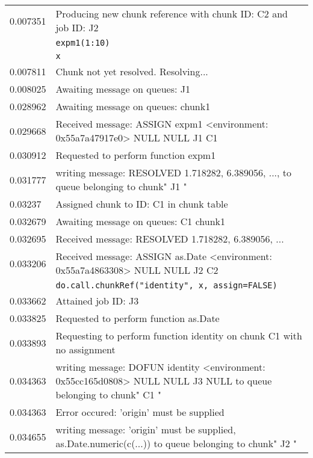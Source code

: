 \documentclass[a4paper,10pt]{article}
\begin{document}
\begin{table}
\begin{tabularx}{\textwidth}{lX}
		0.007351 & \textcolor{\clientcolour}{Producing new chunk reference with chunk ID: C2 and job ID: J2} \\
			 & \textcolor{\clientcolour}{\texttt{expm1(1:10)}} \\
			 & \textcolor{\clientcolour}{\texttt{x}} \\
		0.007811 & \textcolor{\clientcolour}{Chunk not yet resolved. Resolving...} \\
		0.008025 & \textcolor{\clientcolour}{Awaiting message on queues: J1} \\
		0.028962 & \textcolor{\servercolour}{Awaiting message on queues: chunk1} \\
		0.029668 & \textcolor{\servercolour}{Received message: ASSIGN expm1 <environment: 0x55a7a47917e0> NULL NULL J1 C1} \\
		0.030912 & \textcolor{\servercolour}{Requested to perform function expm1} \\
		0.031777 & \textcolor{\servercolour}{writing message: RESOLVED 1.718282, 6.389056, ..., to queue belonging to chunk" J1 "} \\
		0.03237  & \textcolor{\servercolour}{Assigned chunk to ID: C1 in chunk table} \\
		0.032679 & \textcolor{\servercolour}{Awaiting message on queues: C1     chunk1} \\
		0.032695 & \textcolor{\clientcolour}{Received message: RESOLVED 1.718282, 6.389056, ... } \\
		0.033206 & \textcolor{\servercolour}{Received message: ASSIGN as.Date <environment: 0x55a7a4863308> NULL NULL J2 C2} \\
			 & \textcolor{\clientcolour}{\texttt{do.call.chunkRef("identity", x, assign=FALSE)}} \\
		0.033662 & \textcolor{\clientcolour}{Attained job ID:  J3} \\
		0.033825 & \textcolor{\servercolour}{Requested to perform function as.Date} \\
		0.033893 & \textcolor{\clientcolour}{Requesting to perform function identity on chunk C1 with no assignment} \\
		0.034363 & \textcolor{\clientcolour}{writing message: DOFUN identity <environment: 0x55cc165d0808> NULL NULL J3 NULL to queue belonging to chunk" C1 "} \\
		0.034363 & \textcolor{\servercolour}{Error occured: 'origin' must be supplied} \\
		0.034655 & \textcolor{\servercolour}{writing message: 'origin' must be supplied, as.Date.numeric(c(...)) to queue belonging to chunk" J2 "} \\

\end{tabularx}
\end{table}
\end{document}
